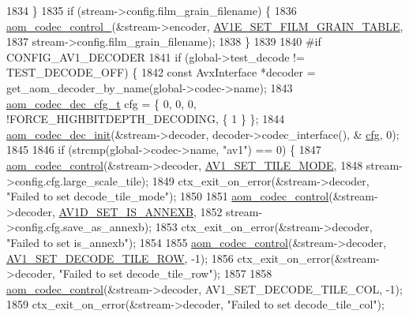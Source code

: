 \begin{DoxyCodeInclude}
{{{{{{{{{{{{{{{{{{{{{{{{{{{{{{{{1834   \}
1835   \textcolor{keywordflow}{if} (stream->config.film\_grain\_filename) \{
1836     \hyperlink{group__codec_ga51eb332a40dcacc39000ab8e0be36b79}{aom\_codec\_control\_}(&stream->encoder, 
      \hyperlink{group__aom__encoder_ggae78dde67a6d78f332e9bdba0dde42db5ad5846c6f49d37e65a03c39e68d487097}{AV1E\_SET\_FILM\_GRAIN\_TABLE},
1837                        stream->config.film\_grain\_filename);
1838   \}
1839 
1840 \textcolor{preprocessor}{#if CONFIG\_AV1\_DECODER}
1841   \textcolor{keywordflow}{if} (global->test\_decode != TEST\_DECODE\_OFF) \{
1842     \textcolor{keyword}{const} AvxInterface *decoder = get\_aom\_decoder\_by\_name(global->codec->name);
1843     \hyperlink{structaom__codec__dec__cfg}{aom\_codec\_dec\_cfg\_t} cfg = \{ 0, 0, 0, !FORCE\_HIGHBITDEPTH\_DECODING, \{ 1 \} \};
1844     \hyperlink{group__decoder_gafdbfca65b19ab1f6d72b32cd01753b9b}{aom\_codec\_dec\_init}(&stream->decoder, decoder->codec\_interface(), &
      \hyperlink{structaom__codec__enc__cfg_a91c4b8e91211a9cea98a8003ef2e4e65}{cfg}, 0);
1845 
1846     \textcolor{keywordflow}{if} (strcmp(global->codec->name, \textcolor{stringliteral}{"av1"}) == 0) \{
1847       \hyperlink{group__codec_ga6da974f4eeaba1fa74106b28d0fe6ac5}{aom\_codec\_control}(&stream->decoder, \hyperlink{group__aom__decoder_gga3865fd4b3192489baa9a5c3632ebe97ba0795d8084ae8c78528c01587198df9e2}{AV1\_SET\_TILE\_MODE},
1848                         stream->config.cfg.large\_scale\_tile);
1849       ctx\_exit\_on\_error(&stream->decoder, \textcolor{stringliteral}{"Failed to set decode\_tile\_mode"});
1850 
1851       \hyperlink{group__codec_ga6da974f4eeaba1fa74106b28d0fe6ac5}{aom\_codec\_control}(&stream->decoder, \hyperlink{group__aom__decoder_gga3865fd4b3192489baa9a5c3632ebe97ba1fb269c5c5913d9995b6c35d28e2a788}{AV1D\_SET\_IS\_ANNEXB},
1852                         stream->config.cfg.save\_as\_annexb);
1853       ctx\_exit\_on\_error(&stream->decoder, \textcolor{stringliteral}{"Failed to set is\_annexb"});
1854 
1855       \hyperlink{group__codec_ga6da974f4eeaba1fa74106b28d0fe6ac5}{aom\_codec\_control}(&stream->decoder, 
      \hyperlink{group__aom__decoder_gga3865fd4b3192489baa9a5c3632ebe97bac056b4cf80427fd05e3c4c9fc46edb78}{AV1\_SET\_DECODE\_TILE\_ROW}, -1);
1856       ctx\_exit\_on\_error(&stream->decoder, \textcolor{stringliteral}{"Failed to set decode\_tile\_row"});
1857 
1858       \hyperlink{group__codec_ga6da974f4eeaba1fa74106b28d0fe6ac5}{aom\_codec\_control}(&stream->decoder, AV1\_SET\_DECODE\_TILE\_COL, -1);
1859       ctx\_exit\_on\_error(&stream->decoder, \textcolor{stringliteral}{"Failed to set decode\_tile\_col"});
}}}}}}}}}}}}}}}}}}}}}}}}}}}}}}}}
\end{DoxyCodeInclude}
